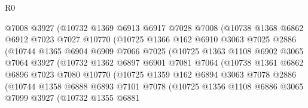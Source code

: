 \begin{lexlean}{R0}
\begin{coremodule}
                    @7008
                    @3927
                    (@10732
                      @1369
                      @6913
                      @6917
                      @7028
                      @7008
                      (@10738
                        @1368
                        @6862
                        @6912
                        @7023
                        @7027
                        @10770
                        (@10725
                          @1366
                          @162
                          @6910
                          @3063
                          @7025
                          @2886
                          (@10744
                            @1365
                            @6904
                            @6909
                            @7066
                            @7025
                            (@10725
                              @1363
                              @1108
                              @6902
                              @3065
                              @7064
                              @3927
                              (@10732
                                @1362
                                @6897
                                @6901
                                @7081
                                @7064
                                (@10738
                                  @1361
                                  @6862
                                  @6896
                                  @7023
                                  @7080
                                  @10770
                                  (@10725
                                    @1359
                                    @162
                                    @6894
                                    @3063
                                    @7078
                                    @2886
                                    (@10744
                                      @1358
                                      @6888
                                      @6893
                                      @7101
                                      @7078
                                      (@10725
                                        @1356
                                        @1108
                                        @6886
                                        @3065
                                        @7099
                                        @3927
                                        (@10732
                                          @1355
                                          @6881

\end{coremodule}
\end{lexlean}
